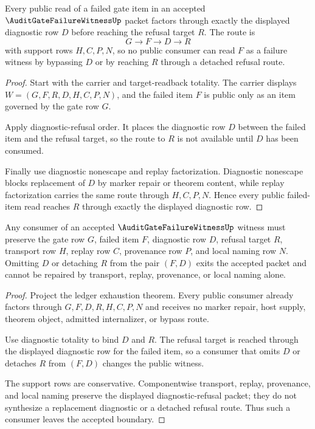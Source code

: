 \begin{theorem}
\label{thm:audit-gate-failure-witness-diagnostic-totality}
Every public read of a failed gate item in an accepted $\AuditGateFailureWitnessUp$ packet factors through exactly the displayed diagnostic row $D$ before reaching the refusal target $R$. The route is
$$
G \to F \to D \to R
$$
with support rows $H,C,P,N$, so no public consumer can read $F$ as a failure witness by bypassing $D$ or by reaching $R$ through a detached refusal route.
\end{theorem}
\begin{proof}
Start with the carrier and target-readback totality. The carrier displays $W=(G,F,R,D,H,C,P,N)$, and the failed item $F$ is public only as an item governed by the gate row $G$.

Apply diagnostic-refusal order. It places the diagnostic row $D$ between the failed item and the refusal target, so the route to $R$ is not available until $D$ has been consumed.

Finally use diagnostic nonescape and replay factorization. Diagnostic nonescape blocks replacement of $D$ by marker repair or theorem content, while replay factorization carries the same route through $H,C,P,N$. Hence every public failed-item read reaches $R$ through exactly the displayed diagnostic row.
\end{proof}

\begin{theorem}
\label{thm:audit-gate-failure-witness-refusal-consumer-boundary}
Any consumer of an accepted $\AuditGateFailureWitnessUp$ witness must preserve the gate row $G$, failed item $F$, diagnostic row $D$, refusal target $R$, transport row $H$, replay row $C$, provenance row $P$, and local naming row $N$. Omitting $D$ or detaching $R$ from the pair $(F,D)$ exits the accepted packet and cannot be repaired by transport, replay, provenance, or local naming alone.
\end{theorem}
\begin{proof}
Project the ledger exhaustion theorem. Every public consumer already factors through $G,F,D,R,H,C,P,N$ and receives no marker repair, host supply, theorem object, admitted internalizer, or bypass route.

Use diagnostic totality to bind $D$ and $R$. The refusal target is reached through the displayed diagnostic row for the failed item, so a consumer that omits $D$ or detaches $R$ from $(F,D)$ changes the public witness.

The support rows are conservative. Componentwise transport, replay, provenance, and local naming preserve the displayed diagnostic-refusal packet; they do not synthesize a replacement diagnostic or a detached refusal route. Thus such a consumer leaves the accepted boundary.
\end{proof}

